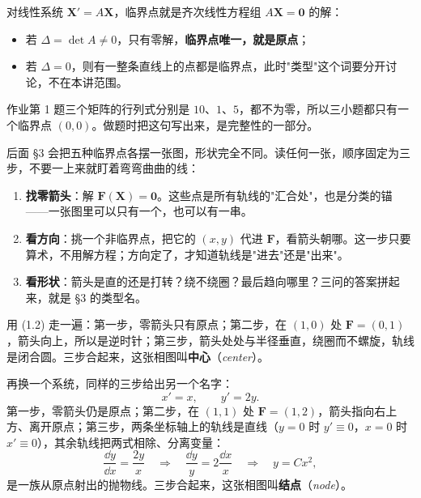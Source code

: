 \documentclass[11pt]{ctexart}
\newcommand{\X}{\mathbf{X}}\newcommand{\Y}{\mathbf{Y}}
\newcommand{\F}{\mathbf{F}}
\newcommand{\EN}[1]{\textcolor{inkgray}{\itshape #1}}
\begin{document}


对线性系统 $\X'=A\X$，临界点就是齐次线性方程组 $A\X=\mathbf{0}$ 的解：

\begin{itemize}
\item 若 $\Delta=\det A\neq0$，只有零解，\textbf{临界点唯一，就是原点}；
\item 若 $\Delta=0$，则有一整条直线上的点都是临界点，此时"类型"这个词要分开讨论，不在本讲范围。
\end{itemize}

作业第 1 题三个矩阵的行列式分别是 $10$、$1$、$5$，都不为零，所以三小题都只有一个临界点 $(0,0)$。做题时把这句写出来，是完整性的一部分。


后面 §3 会把五种临界点各摆一张图，形状完全不同。读任何一张，顺序固定为三步，不要一上来就盯着弯弯曲曲的线：

\begin{enumerate}
\item \textbf{找零箭头}：解 $\F(\X)=\mathbf{0}$。这些点是所有轨线的"汇合处"，也是分类的锚——一张图里可以只有一个，也可以有一串。
\item \textbf{看方向}：挑一个非临界点，把它的 $(x,y)$ 代进 $\F$，看箭头朝哪。这一步只要算术，不用解方程；方向定了，才知道轨线是"进去"还是"出来"。
\item \textbf{看形状}：箭头是直的还是打转？绕不绕圈？最后趋向哪里？三问的答案拼起来，就是 §3 的类型名。
\end{enumerate}

用 (1.2) 走一遍：第一步，零箭头只有原点；第二步，在 $(1,0)$ 处 $\F=(0,1)$，箭头向上，所以是逆时针；第三步，箭头处处与半径垂直，绕圈而不螺旋，轨线是闭合圆。三步合起来，这张相图叫\textbf{中心}（\EN{center}）。

再换一个系统，同样的三步给出另一个名字：
\[
x'=x,\qquad y'=2y .
\]
第一步，零箭头仍是原点；第二步，在 $(1,1)$ 处 $\F=(1,2)$，箭头指向右上方、离开原点；第三步，两条坐标轴上的轨线是直线（$y=0$ 时 $y'\equiv0$，$x=0$ 时 $x'\equiv0$），其余轨线把两式相除、分离变量：
\[
\frac{\dd y}{\dd x}=\frac{2y}{x}
\quad\Longrightarrow\quad
\frac{\dd y}{y}=2\frac{\dd x}{x}
\quad\Longrightarrow\quad
y=Cx^{2},
\]
是一族从原点射出的抛物线。三步合起来，这张相图叫\textbf{结点}（\EN{node}）。
\end{document}
